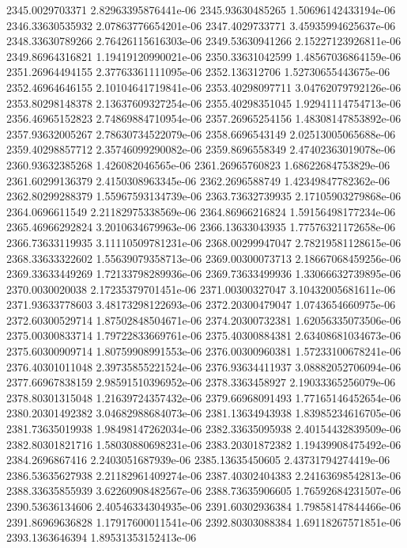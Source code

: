 {2345.0029703371 2.82963395876441e-06
2345.93630485265 1.50696142433194e-06
2346.33630535932 2.07863776654201e-06
2347.4029733771 3.45935994625637e-06
2348.33630789266 2.76426115616303e-06
2349.53630941266 2.15227123926811e-06
2349.86964316821 1.19419120990021e-06
2350.33631042599 1.48567036864159e-06
2351.26964494155 2.37763361111095e-06
2352.136312706 1.52730655443675e-06
2352.46964646155 2.10104641719841e-06
2353.40298097711 3.04762079792126e-06
2353.80298148378 2.13637609327254e-06
2355.40298351045 1.92941114754713e-06
2356.46965152823 2.74869884710954e-06
2357.26965254156 1.48308147853892e-06
2357.93632005267 2.78630734522079e-06
2358.6696543149 2.02513005065688e-06
2359.40298857712 2.35746099290082e-06
2359.8696558349 2.47402363019078e-06
2360.93632385268 1.426082046565e-06
2361.26965760823 1.68622684753829e-06
2361.60299136379 2.4150308963345e-06
2362.2696588749 1.42349847782362e-06
2362.80299288379 1.55967593134739e-06
2363.73632739935 2.17105903279868e-06
2364.0696611549 2.21182975338569e-06
2364.86966216824 1.59156498177234e-06
2365.46966292824 3.2010634679963e-06
2366.13633043935 1.77576321172658e-06
2366.73633119935 3.11110509781231e-06
2368.00299947047 2.78219581128615e-06
2368.33633322602 1.55639079358713e-06
2369.00300073713 2.18667068459256e-06
2369.33633449269 1.72133798289936e-06
2369.73633499936 1.33066632739895e-06
2370.0030020038 2.17235379701451e-06
2371.00300327047 3.10432005681611e-06
2371.93633778603 3.48173298122693e-06
2372.20300479047 1.0743654660975e-06
2372.60300529714 1.87502848504671e-06
2374.20300732381 1.62056335073506e-06
2375.00300833714 1.79722833669761e-06
2375.40300884381 2.63408681034673e-06
2375.60300909714 1.80759908991553e-06
2376.00300960381 1.57233100678241e-06
2376.40301011048 2.39735855221524e-06
2376.93634411937 3.08882052706094e-06
2377.66967838159 2.98591510396952e-06
2378.3363458927 2.19033365256079e-06
2378.80301315048 1.21639724357432e-06
2379.66968091493 1.77165146452654e-06
2380.20301492382 3.04682988684073e-06
2381.13634943938 1.83985234616705e-06
2381.73635019938 1.98498147262034e-06
2382.33635095938 2.40154432839509e-06
2382.80301821716 1.58030880698231e-06
2383.20301872382 1.19439908475492e-06
2384.2696867416 2.2403051687939e-06
2385.13635450605 2.43731794274419e-06
2386.53635627938 2.21182961409274e-06
2387.40302404383 2.24163698542813e-06
2388.33635855939 3.62260908482567e-06
2388.73635906605 1.76592684231507e-06
2390.53636134606 2.40546334304935e-06
2391.60302936384 1.79858147844466e-06
2391.86969636828 1.17917600011541e-06
2392.80303088384 1.69118267571851e-06
2393.1363646394 1.89531353152413e-06
}
